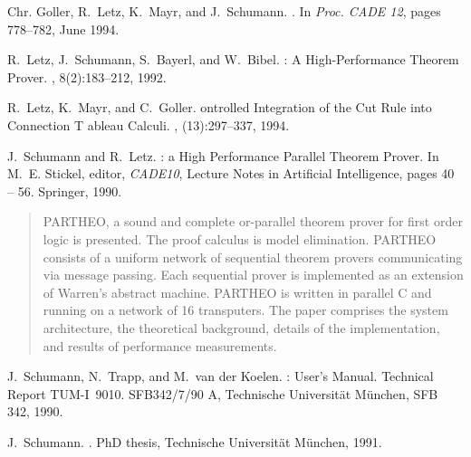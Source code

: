 \begin{thebibliography}{}

Chr. Goller, R.~Letz, K.~Mayr, and J.~Schumann.
.
\newblock In {\em Proc. CADE 12}, pages 778--782, June 1994.

R.~Letz, J.~Schumann, S.~Bayerl, and W.~Bibel.
: {A} {H}igh-{P}erformance {T}heorem {P}rover.
, 8(2):183--212, 1992.

R.~Letz, K.~Mayr, and C.~Goller.
ontrolled {I}ntegration of the {C}ut {R}ule into {C}onnection {T}
  ableau {C}alculi.
, (13):297--337, 1994.

J.~Schumann and R.~Letz.
: a {H}igh {P}erformance {P}arallel {T}heorem {P}rover.
\newblock In M.~E. Stickel, editor, {\em CADE10}, Lecture Notes in Artificial
  Intelligence, pages 40 -- 56. Springer, 1990.
\begin{quotation}
{\small PARTHEO}, a sound and complete or-parallel theorem prover for first order
logic is presented. The proof calculus is model elimination.
{\small PARTHEO} consists of a uniform network of
sequential theorem provers communicating via message
passing. Each sequential prover is implemented as an
extension of Warren's abstract machine.
{\small PARTHEO} is written in parallel C and running on a network of 16
transputers.
The paper comprises the system architecture, the theoretical background,
details of the implementation,
and results of performance measurements.
\end{quotation}

J.~Schumann, N.~Trapp, and {M.\ van der} Koelen.
: {U}ser's {M}anual.
\newblock Technical Report TUM-I\ 9010. SFB342/7/90 A, Technische
  {Universit\"at M\"unchen}, SFB 342, 1990.

J.~Schumann.
.
\newblock PhD thesis, Technische Universit\"at M\"unchen, 1991.


\end{thebibliography}
